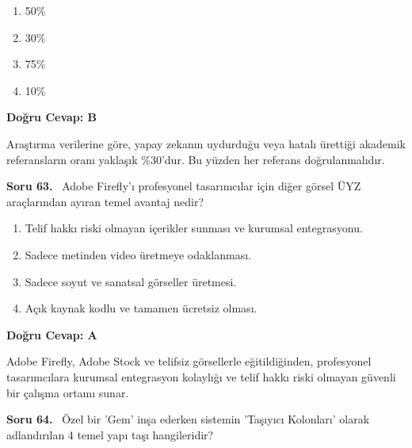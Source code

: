 \documentclass[11pt,a4paper,openany]{book}
\begin{document}
\begin{enumerate}[label=\Alph*), leftmargin=25pt, topsep=4pt, itemsep=2pt]
        \item 50\%
        \item 30\%
        \item 75\%
        \item 10\%
\end{enumerate}

\vspace{4pt}
\begin{tcolorbox}[title=Cevap ve Açıklama, colback=gray!3!white, colframe=primarycolor!90!black, arc=2mm, fonttitle=\bfseries\sffamily, top=6pt, bottom=6pt]
    \textbf{Doğru Cevap: B}

    \vspace{2pt}
    Araştırma verilerine göre, yapay zekanın uydurduğu veya hatalı ürettiği akademik referansların oranı yaklaşık \%30'dur. Bu yüzden her referans doğrulanmalıdır.
\end{tcolorbox}
\vspace{10pt}
\needspace{5cm}
\vspace{8pt}
\noindent\textbf{\large\sffamily Soru 63.} \ Adobe Firefly'ı profesyonel tasarımcılar için diğer görsel ÜYZ araçlarından ayıran temel avantaj nedir?

\begin{enumerate}[label=\Alph*), leftmargin=25pt, topsep=4pt, itemsep=2pt]
        \item Telif hakkı riski olmayan içerikler sunması ve kurumsal entegrasyonu.
        \item Sadece metinden video üretmeye odaklanması.
        \item Sadece soyut ve sanatsal görseller üretmesi.
        \item Açık kaynak kodlu ve tamamen ücretsiz olması.
\end{enumerate}

\vspace{4pt}
\begin{tcolorbox}[title=Cevap ve Açıklama, colback=gray!3!white, colframe=primarycolor!90!black, arc=2mm, fonttitle=\bfseries\sffamily, top=6pt, bottom=6pt]
    \textbf{Doğru Cevap: A}

    \vspace{2pt}
    Adobe Firefly, Adobe Stock ve telifsiz görsellerle eğitildiğinden, profesyonel tasarımcılara kurumsal entegrasyon kolaylığı ve telif hakkı riski olmayan güvenli bir çalışma ortamı sunar.
\end{tcolorbox}
\vspace{10pt}
\needspace{5cm}
\vspace{8pt}
\noindent\textbf{\large\sffamily Soru 64.} \ Özel bir 'Gem' inşa ederken sistemin 'Taşıyıcı Kolonları' olarak adlandırılan 4 temel yapı taşı hangileridir?
\end{document}
